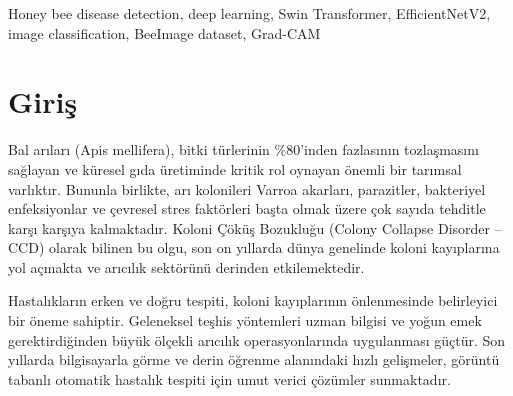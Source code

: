 \documentclass[conference]{IEEEtran}
\begin{document}
\begin{abstract}
Honey bees (Apis mellifera) play a critical role in global agricultural ecosystems, and diseases remain among the leading causes of colony losses. This study presents a comprehensive deep learning-based image classification system for the automatic detection of six honey bee health conditions: Ant Problems, Small Hive Beetles, Healthy, Robbed Hive, Missing Queen, and Varroa mites. Three distinct approaches are systematically compared on the BeeImage dataset comprising 5,172 images: EfficientNetV2-S, Swin Transformer, and a Hybrid CNN + Gradient Boosting ensemble. Applied for the first time on this dataset, Swin Transformer achieves 98.74\% accuracy and 98.75\% F1 score, surpassing the existing literature record of 98.65\%. The heterogeneous ensemble of EfficientNetV2-S and Swin Transformer reaches 98.65\% accuracy with a weighted F1 score of 98.65\%, outperforming all prior works in terms of F1. Grad-CAM visualizations and detailed error analysis provide interpretability insights into model decision-making. Results demonstrate that Transformer-based architectures offer a strong alternative to conventional CNNs for bee health monitoring systems.
\end{abstract}

\begin{IEEEkeywords}
Honey bee disease detection, deep learning, Swin Transformer, EfficientNetV2, image classification, BeeImage dataset, Grad-CAM
\end{IEEEkeywords}


\section{Giriş}

Bal arıları (Apis mellifera), bitki türlerinin \%80'inden fazlasının tozlaşmasını sağlayan ve küresel gıda üretiminde kritik rol oynayan önemli bir tarımsal varlıktır. Bununla birlikte, arı kolonileri Varroa akarları, parazitler, bakteriyel enfeksiyonlar ve çevresel stres faktörleri başta olmak üzere çok sayıda tehditle karşı karşıya kalmaktadır. Koloni Çöküş Bozukluğu (Colony Collapse Disorder -- CCD) olarak bilinen bu olgu, son on yıllarda dünya genelinde koloni kayıplarına yol açmakta ve arıcılık sektörünü derinden etkilemektedir.

Hastalıkların erken ve doğru tespiti, koloni kayıplarının önlenmesinde belirleyici bir öneme sahiptir. Geleneksel teşhis yöntemleri uzman bilgisi ve yoğun emek gerektirdiğinden büyük ölçekli arıcılık operasyonlarında uygulanması güçtür. Son yıllarda bilgisayarla görme ve derin öğrenme alanındaki hızlı gelişmeler, görüntü tabanlı otomatik hastalık tespiti için umut verici çözümler sunmaktadır.
\end{document}
